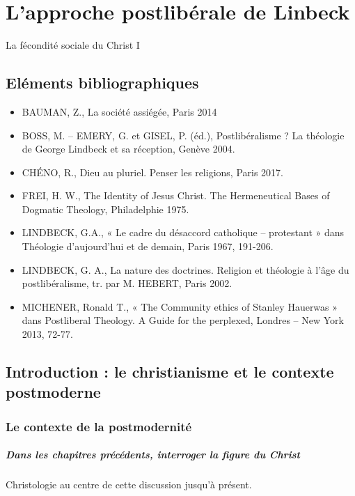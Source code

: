 \chapter{L’approche postlibérale de Linbeck}
La fécondité sociale du Christ I


\section{Eléments bibliographiques}

\begin{itemize}
    \item 
BAUMAN, Z., La société assiégée, Paris 2014
    \item BOSS, M. – EMERY, G. et GISEL, P. (éd.), Postlibéralisme ? La théologie de George Lindbeck
et sa réception, Genève 2004.
    \item CHÉNO, R., Dieu au pluriel. Penser les religions, Paris 2017.
    \item FREI, H. W., The Identity of Jesus Christ. The Hermeneutical Bases of Dogmatic Theology,
Philadelphie 1975.
    \item LINDBECK, G.A., « Le cadre du désaccord catholique – protestant » dans Théologie
d’aujourd’hui et de demain, Paris 1967, 191-206.
    \item LINDBECK, G. A., La nature des doctrines. Religion et théologie à l’âge du postlibéralisme,
tr. par M. HEBERT, Paris 2002.
    \item MICHENER, Ronald T., « The Community ethics of Stanley Hauerwas » dans Postliberal
Theology. A Guide for the perplexed, Londres – New York 2013, 72-77.
\end{itemize}


\section{Introduction : le christianisme et le contexte postmoderne}

\subsection{Le contexte de la postmodernité}

\paragraph{Dans les chapitres précédents, interroger la figure du Christ}
Christologie au centre de cette discussion jusqu’à présent. 


